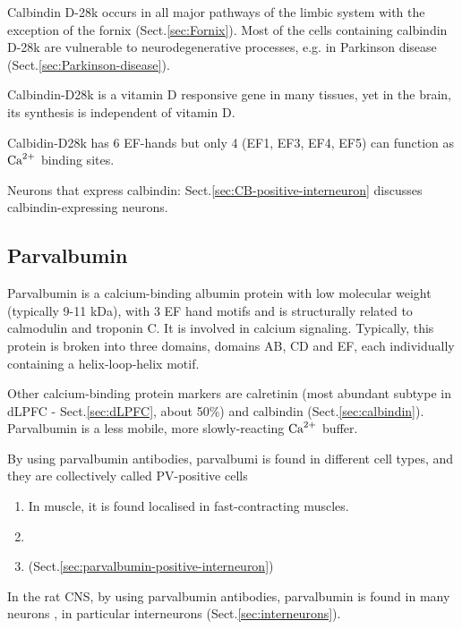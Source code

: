 Calbindin D-28k occurs in all major pathways of the limbic system with the
exception of the fornix (Sect.\ref{sec:Fornix}). Most of the cells containing
calbindin D-28k are vulnerable to neurodegenerative processes, e.g. in Parkinson
disease (Sect.\ref{sec:Parkinson-disease}).

Calbindin-D28k is a vitamin D responsive gene in many tissues, yet in the brain,
its synthesis is independent of vitamin D.

Calbidin-D28k has 6 EF-hands but only 4 (EF1, EF3, EF4, EF5) can function as
${\text{Ca}^{2+}}$ binding sites. 

Neurons that express calbindin: Sect.\ref{sec:CB-positive-interneuron} discusses
calbindin-expressing neurons.


\subsection{Parvalbumin}
\label{sec:parvalbumin}

Parvalbumin is a calcium-binding albumin protein with low molecular weight
(typically 9-11 kDa), with 3 EF hand motifs and is structurally related to
calmodulin and troponin C. It is involved in calcium signaling. Typically, this
protein is broken into three domains, domains AB, CD and EF, each individually
containing a helix-loop-helix motif.

Other calcium-binding protein markers are calretinin (most abundant subtype in
dLPFC - Sect.\ref{sec:dLPFC}, about 50\%) and calbindin
(Sect.\ref{sec:calbindin}). Parvalbumin is a less mobile, more slowly-reacting
${\text{Ca}^{2+}}$ buffer.

By using parvalbumin antibodies, parvalbumi is found in different cell types,
and they are collectively called PV-positive cells 
\begin{enumerate}
  
  \item In muscle, it is found localised in fast-contracting muscles.
  \item 
  \item  (Sect.\ref{sec:parvalbumin-positive-interneuron})
\end{enumerate}



In the rat CNS, by using parvalbumin antibodies, parvalbumin is found in many
neurons \citep{celio1990}, in particular interneurons
(Sect.\ref{sec:interneurons}).


